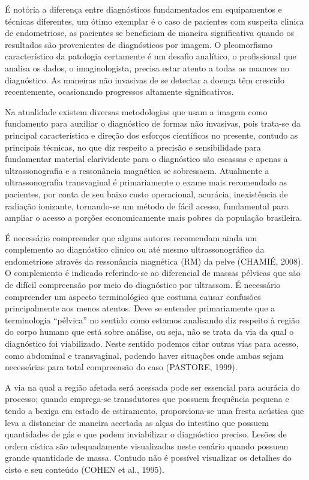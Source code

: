 \documentclass[12pt]{article} %
\begin{document}
É notória a diferença entre diagnósticos fundamentados em equipamentos e técnicas diferentes, um ótimo exemplar é o caso de pacientes com suspeita clinica de endometriose, as pacientes se beneficiam de maneira significativa quando os resultados são provenientes de diagnósticos por imagem. O pleomorfismo característico da patologia certamente é um desafio analítico, o profissional que analisa os dados, o imaginologista, precisa estar atento a todas as nuances no diagnóstico. As maneiras não invasivas de se detectar a doença têm crescido recentemente, ocasionando progressos altamente significativos. 

Na atualidade existem diversas metodologias que usam a imagem como fundamento para auxiliar o diagnóstico de formas não invasivas, pois trata-se da principal característica e direção dos esforços científicos no presente, contudo as principais técnicas, no que diz respeito a precisão e sensibilidade para fundamentar material clarividente para o diagnóstico são escassas e apenas a ultrassonografia e a ressonância magnética se sobressaem. Atualmente a ultrassonografia transvaginal é primariamente o exame mais recomendado as pacientes, por conta de seu baixo custo operacional, acurácia, inexistência de radiação ionizante, tornando-se um método de fácil acesso, fundamental para ampliar o acesso a porções economicamente mais pobres da população brasileira.

É necessário compreender que alguns autores recomendam ainda um complemento ao diagnóstico clinico ou até mesmo ultrassonográfico da endometriose através da ressonância magnética (RM) da pelve (CHAMIÉ, 2008). O complemento é indicado referindo-se ao diferencial de massas pélvicas que são de difícil compreensão por meio do diagnóstico por ultrassom. 
É necessário compreender um aspecto terminológico que costuma causar confusões principalmente aos menos atentos. Deve se entender primariamente que a terminologia “pélvica” no sentido como estamos analisando diz respeito à região do corpo humano que está sobre análise, ou seja, não se trata da via da qual o diagnóstico foi viabilizado. Neste sentido podemos citar outras vias para acesso, como abdominal e transvaginal, podendo haver situações onde ambas sejam necessárias para total compreensão do caso (PASTORE, 1999).

A via na qual a região afetada será acessada pode ser essencial para acurácia do processo; quando emprega-se transdutores que possuem frequência pequena e tendo a bexiga em estado de estiramento, proporciona-se uma fresta acústica que leva a distanciar de maneira acertada as alças do intestino que possuem quantidades de gás e que podem inviabilizar o diagnóstico preciso. Lesões de ordem cística são adequadamente visualizadas neste cenário quando possuem grande quantidade de massa. Contudo não é possível visualizar os detalhes do cisto e seu conteúdo (COHEN et al., 1995).
\end{document}
